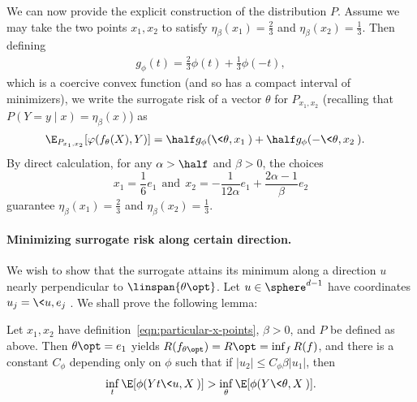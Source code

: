 \documentclass[11pt]{article}
\newcommand{\sloss}{\varphi}  %
\begin{document}
We can now provide the explicit construction of the distribution $P$.
%
Assume we may take the two points $x_1, x_2$ to satisfy
$\eta_\beta(x_1) = \frac{2}{3}$ and $\eta_\beta(x_2) = \frac{1}{3}$.
%
Then defining
\begin{align*}
  g_\phi(t) = \frac{2}{3}\phi(t) +\frac{1}{3} \phi(-t),
\end{align*}
which is a coercive convex function (and so has a compact interval of
minimizers), we write the surrogate risk of a vector $\theta$ for $P_{x_1,
  x_2}$ (recalling that $P(Y = y \mid x) = \eta_\beta(x)$) as
\begin{align*}
  \E_{P_{x_1,x_2}}[\sloss(f_\theta(X), Y)]
  & = \half g_\phi(\<\theta, x_1\>) + \half g_\phi(-\<\theta, x_2\>).
\end{align*}
By direct calculation, for any $\alpha > \half$ and $\beta > 0$,
the choices
\begin{equation}
  \label{eqn:particular-x-points}
  x_1 = \frac{1}{6} e_1
  ~~ \mbox{and} ~~
  x_2 = -\frac{1}{12 \alpha} e_1 + \frac{2 \alpha - 1}{\beta} e_2
\end{equation}
guarantee $\eta_\beta(x_1) = \frac{2}{3}$ and $\eta_\beta(x_2) = \frac{1}{3}$.


\paragraph{Minimizing surrogate risk along certain direction.}
We wish to show that the surrogate attains its minimum along
a direction $u$ nearly perpendicular to $\linspan\{\theta\opt\}$.
%
Let $u \in \sphere^{d-1}$ have coordinates
$u_j = \<u, e_j\>$.
%
We shall prove the following lemma:
\begin{lemma}
  \label{lemma:minimizers-small-u2}
  Let $x_1, x_2$ have definition~\eqref{eqn:particular-x-points}, $\beta >
  0$, and $P$ be defined as above.
  Then $\theta\opt = e_1$ yields $R(f_{\theta\opt}) = R\opt = \inf_f R(f)$,
  and there is a constant $C_\phi$ depending only on $\phi$ such that if
  $|u_2| \le C_\phi \beta |u_1|$, then
  \begin{equation*}
    \inf_t \E[\phi(Y t\<u, X\>)]
    > \inf_\theta \E[\phi(Y \<\theta, X\>)].
  \end{equation*}
\end{lemma}
\end{document}
